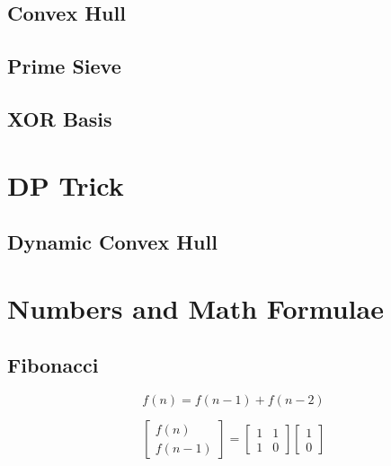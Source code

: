 \documentclass[twocolumn]{article}
\begin{document}
\subsection{Convex Hull}


\subsection{Prime Sieve}


\subsection{XOR Basis}


\section{DP Trick}

\subsection{Dynamic Convex Hull}


\section{Numbers and Math Formulae}

\subsection{Fibonacci}

$$f(n)=f(n-1)+f(n-2)$$

\begin{equation*}
    \begin{bmatrix}
        f(n) \\
        f(n - 1)
    \end{bmatrix}
    =
    \begin{bmatrix}
        1 & 1 \\
        1 & 0
    \end{bmatrix}
    \begin{bmatrix}
        1 \\
        0
    \end{bmatrix}
\end{equation*}
\end{document}
